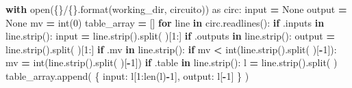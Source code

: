 \documentclass[
  italian,
]{book}
\newenvironment{Shaded}{\begin{snugshade}}{\end{snugshade}}
\newcommand{\BuiltInTok}[1]{#1}
\newcommand{\ControlFlowTok}[1]{\textcolor[rgb]{0.13,0.29,0.53}{\textbf{#1}}}
\newcommand{\DecValTok}[1]{\textcolor[rgb]{0.00,0.00,0.81}{#1}}
\newcommand{\ImportTok}[1]{#1}
\newcommand{\KeywordTok}[1]{\textcolor[rgb]{0.13,0.29,0.53}{\textbf{#1}}}
\newcommand{\NormalTok}[1]{#1}
\newcommand{\OperatorTok}[1]{\textcolor[rgb]{0.81,0.36,0.00}{\textbf{#1}}}
\newcommand{\SpecialCharTok}[1]{\textcolor[rgb]{0.00,0.00,0.00}{#1}}
\newcommand{\StringTok}[1]{\textcolor[rgb]{0.31,0.60,0.02}{#1}}
\newcommand{\VariableTok}[1]{\textcolor[rgb]{0.00,0.00,0.00}{#1}}
\begin{document}
\begin{Shaded}
\begin{Highlighting}[]
\ControlFlowTok{with} \BuiltInTok{open}\NormalTok{(}\StringTok{\textquotesingle{}}\SpecialCharTok{\{\}}\StringTok{/}\SpecialCharTok{\{\}}\StringTok{\textquotesingle{}}\NormalTok{.}\BuiltInTok{format}\NormalTok{(working\_dir, circuito)) }\ImportTok{as}\NormalTok{ circ:}
    \BuiltInTok{input} \OperatorTok{=} \VariableTok{None}
\NormalTok{    output }\OperatorTok{=} \VariableTok{None}
\NormalTok{    mv }\OperatorTok{=} \BuiltInTok{int}\NormalTok{(}\DecValTok{0}\NormalTok{)}
\NormalTok{    table\_array }\OperatorTok{=}\NormalTok{ []}
    \ControlFlowTok{for}\NormalTok{ line }\KeywordTok{in}\NormalTok{ circ.readlines():}
        \ControlFlowTok{if} \StringTok{\textquotesingle{}.inputs\textquotesingle{}} \KeywordTok{in}\NormalTok{ line.strip():}
            \BuiltInTok{input} \OperatorTok{=}\NormalTok{ line.strip().split(}\StringTok{\textquotesingle{} \textquotesingle{}}\NormalTok{)[}\DecValTok{1}\NormalTok{:]}
        \ControlFlowTok{if} \StringTok{\textquotesingle{}.outputs\textquotesingle{}} \KeywordTok{in}\NormalTok{ line.strip():}
\NormalTok{            output }\OperatorTok{=}\NormalTok{ line.strip().split(}\StringTok{\textquotesingle{} \textquotesingle{}}\NormalTok{)[}\DecValTok{1}\NormalTok{:]}
        \ControlFlowTok{if} \StringTok{\textquotesingle{}.mv\textquotesingle{}} \KeywordTok{in}\NormalTok{ line.strip():}
            \ControlFlowTok{if}\NormalTok{ mv }\OperatorTok{\textless{}} \BuiltInTok{int}\NormalTok{(line.strip().split(}\StringTok{\textquotesingle{} \textquotesingle{}}\NormalTok{)[}\OperatorTok{{-}}\DecValTok{1}\NormalTok{]):}
\NormalTok{                mv }\OperatorTok{=} \BuiltInTok{int}\NormalTok{(line.strip().split(}\StringTok{\textquotesingle{} \textquotesingle{}}\NormalTok{)[}\OperatorTok{{-}}\DecValTok{1}\NormalTok{])}
        \ControlFlowTok{if} \StringTok{\textquotesingle{}.table\textquotesingle{}} \KeywordTok{in}\NormalTok{ line.strip():}
\NormalTok{            l }\OperatorTok{=}\NormalTok{ line.strip().split(}\StringTok{\textquotesingle{} \textquotesingle{}}\NormalTok{)}
\NormalTok{            table\_array.append(}
\NormalTok{                \{}
                    \StringTok{\textquotesingle{}input\textquotesingle{}}\NormalTok{:    l[}\DecValTok{1}\NormalTok{:}\BuiltInTok{len}\NormalTok{(l)}\OperatorTok{{-}}\DecValTok{1}\NormalTok{],}
                    \StringTok{\textquotesingle{}output\textquotesingle{}}\NormalTok{:   l[}\OperatorTok{{-}}\DecValTok{1}\NormalTok{]}
\NormalTok{                \}}
\NormalTok{            )}

\end{Highlighting}
\end{Shaded}
\end{document}
